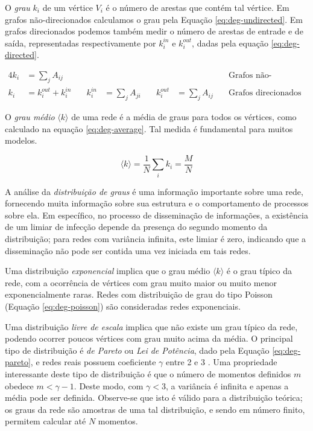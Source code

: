 O \emph{grau} $k_i$ de um vértice $V_i$ é o número de arestas que contém tal vértice. Em grafos não-direcionados 
calculamos o grau pela Equação \ref{eq:deg-undirected}. Em grafos direcionados podemos também medir 
o número de arestas de entrade e de saída, representadas respectivamente por $k^{in}_i$ e $k^{out}_i$, 
dadas pela equação \ref{eq:deg-directed}. 

\begin{alignat}{4}
 k_i &= \sum_{j} A_{ij}      &\quad          &                  &\quad           &                  &\quad \text{Grafos não-direcionados}\label{eq:deg-undirected} \\
 k_i &= k_i^{out} + k_i^{in} &\quad k_i^{in} &= \sum_{j} A_{ji} &\quad k_i^{out} &= \sum_{j} A_{ij} &\quad \text{Grafos direcionados}\label{eq:deg-directed}
\end{alignat}

O \emph{grau médio} $\langle k \rangle$ de uma rede é a média de graus para todos os vértices, como calculado
na equação \ref{eq:deg-average}. Tal medida é fundamental para muitos modelos.

\begin{equation}
 \langle k \rangle = \frac{1}{N} \sum_{i} k_i = \frac{M}{N}
 \label{eq:deg-average}
\end{equation}

A análise da \emph{distribuição de graus} é uma informação importante sobre uma rede, fornecendo muita informação 
sobre sua estrutura e o comportamento de processos sobre ela. Em específico, no processo de disseminação de informações,
a existência de um limiar de infecção depende da presença do segundo momento da distribuição; 
para redes com variância infinita, este limiar é zero, indicando que a disseminação não pode ser contida uma vez iniciada
em tais redes.

Uma distribuição \emph{exponencial} implica que o grau médio $\langle k \rangle$ é o grau típico da rede, com a 
ocorrência de vértices com grau muito maior ou muito menor exponencialmente raras. Redes com distribuição de grau 
do tipo Poisson (Equação \ref{eq:deg-poisson}) são consideradas redes exponenciais.

Uma distribuição \emph{livre de escala} implica que não existe um grau típico da rede, podendo ocorrer poucos vértices 
com grau muito acima da média. O principal tipo de distribuição é \emph{de Pareto} ou \emph{Lei de Potência}, 
dado pela Equação \ref{eq:deg-pareto}, e redes reais possuem coeficiente $\gamma$ entre 2 e 3 \cite{costa2007characterization}. 
Uma propriedade interessante deste tipo de distribuição é que o número de momentos definidos $m$ obedece 
$m < \gamma-1$. Deste modo, com $\gamma < 3$, a variância é infinita e apenas a média pode ser definida. 
Observe-se que isto é válido para a distribuição teórica; os graus da rede são amostras de uma tal distribuição, 
e sendo em número finito, permitem calcular até $N$ momentos.

